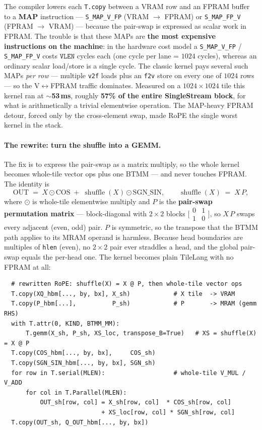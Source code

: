 \documentclass[
  10pt,
]{article}
\begin{document}
The compiler lowers each \texttt{T.copy} between a VRAM row and an FPRAM
buffer to a \textbf{MAP} instruction --- \texttt{S\_MAP\_V\_FP} (VRAM
\(\rightarrow\) FPRAM) or \texttt{S\_MAP\_FP\_V} (FPRAM \(\rightarrow\)
VRAM) --- because the pair-swap is expressed as scalar work in FPRAM. The
trouble is that these MAPs are \textbf{the most expensive instructions on
the machine}: in the hardware cost model a \texttt{S\_MAP\_V\_FP} /
\texttt{S\_MAP\_FP\_V} costs \(\mathtt{VLEN}\) cycles each (one cycle per
lane = \(1024\) cycles), whereas an ordinary scalar load/store is a
single cycle. The classic kernel pays several such MAPs \emph{per row} ---
multiple \texttt{v2f} loads plus an \texttt{f2v} store on every one of
\(1024\) rows --- so the V\(\leftrightarrow\)FPRAM traffic dominates.
Measured on a \(1024\times1024\) tile this kernel ran at
\textbf{\(\sim\)53\,ms}, roughly \textbf{57\% of the entire SingleStream
block}, for what is arithmetically a trivial elementwise operation. The
MAP-heavy FPRAM detour, forced only by the cross-element swap, made RoPE
the single worst kernel in the stack.

\paragraph{The rewrite: turn the shuffle into a GEMM.} The fix is to
express the pair-swap as a matrix multiply, so the whole kernel becomes
whole-tile vector ops plus one BTMM --- and never touches FPRAM. The
identity is
\[
  \mathrm{OUT} \;=\; X \odot \mathrm{COS}
  \;+\; \operatorname{shuffle}(X) \odot \mathrm{SGN\_SIN},
  \qquad
  \operatorname{shuffle}(X) \;=\; X \, P,
\]
where \(\odot\) is whole-tile elementwise multiply and \(P\) is the
\textbf{pair-swap permutation matrix} --- block-diagonal with \(2\times2\)
blocks \(\bigl[\begin{smallmatrix}0&1\\1&0\end{smallmatrix}\bigr]\), so
\(X\,P\) swaps every adjacent (even, odd) pair. \(P\) is symmetric, so
the transpose that the BTMM path applies to its MRAM operand is harmless.
Because head boundaries are multiples of \texttt{hlen} (even), no
\(2\times2\) pair ever straddles a head, and the global pair-swap equals
the per-head one. The kernel becomes plain TileLang with no FPRAM at all:

\begin{verbatim}
  # rewritten RoPE: shuffle(X) = X @ P, then whole-tile vector ops
  T.copy(XQ_hbm[..., by, bx], X_sh)            # X tile  -> VRAM
  T.copy(P_hbm[...],          P_sh)            # P       -> MRAM (gemm RHS)
  with T.attr(0, KIND, BTMM_MM):
      T.gemm(X_sh, P_sh, XS_loc, transpose_B=True)   # XS = shuffle(X) = X @ P
  T.copy(COS_hbm[..., by, bx],     COS_sh)
  T.copy(SGN_SIN_hbm[..., by, bx], SGN_sh)
  for row in T.serial(MLEN):                   # whole-tile V_MUL / V_ADD
      for col in T.Parallel(MLEN):
          OUT_sh[row, col] = X_sh[row, col]  * COS_sh[row, col]
                           + XS_loc[row, col] * SGN_sh[row, col]
  T.copy(OUT_sh, Q_OUT_hbm[..., by, bx])
\end{verbatim}
\end{document}
